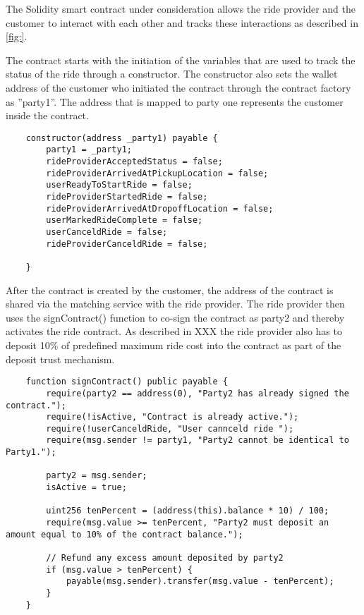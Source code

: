 The Solidity smart contract under consideration allows the ride provider and the customer to interact with each other and tracks these interactions as described in \ref{fig:}.

The contract starts with the initiation of the variables that are used to track the status of the ride through a constructor. The constructor also sets the wallet address of the customer who initiated the contract through the contract factory as ''party1''. The address that is mapped to party one represents the customer inside the contract.

\lstset{
  basicstyle=\footnotesize\ttfamily,
  breaklines=true,
  numbers=left,
  firstnumber=30
}

\begin{lstlisting}
    constructor(address _party1) payable {
        party1 = _party1;
        rideProviderAcceptedStatus = false;
        rideProviderArrivedAtPickupLocation = false;
        userReadyToStartRide = false;
        rideProviderStartedRide = false;
        rideProviderArrivedAtDropoffLocation = false;
        userMarkedRideComplete = false;
        userCanceldRide = false;
        rideProviderCanceldRide = false;

    }
\end{lstlisting}

After the contract is created by the customer, the address of the contract is shared via the matching service with the ride provider. The ride provider then uses the signContract() function to co-sign the contract as party2 and thereby activates the ride contract. As described in XXX the ride provider also has to deposit 10\% of predefined  maximum ride cost into the contract as part of the deposit trust mechanism.

\lstset{
  basicstyle=\footnotesize\ttfamily,
  breaklines=true,
  numbers=left,
  firstnumber=76
}

\begin{lstlisting}
    function signContract() public payable {
        require(party2 == address(0), "Party2 has already signed the contract.");
        require(!isActive, "Contract is already active.");
        require(!userCanceldRide, "User cannceld ride ");
        require(msg.sender != party1, "Party2 cannot be identical to Party1.");
        
        party2 = msg.sender;
        isActive = true;

        uint256 tenPercent = (address(this).balance * 10) / 100;
        require(msg.value >= tenPercent, "Party2 must deposit an amount equal to 10% of the contract balance.");

        // Refund any excess amount deposited by party2
        if (msg.value > tenPercent) {
            payable(msg.sender).transfer(msg.value - tenPercent);
        }
    }
\end{lstlisting}

